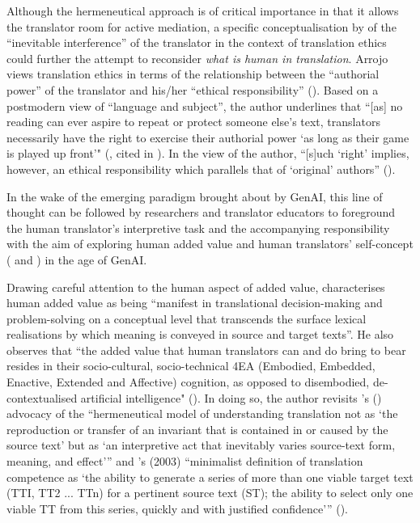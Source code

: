 \documentclass[output=paper,colorlinks,citecolor=brown]{langscibook}
\begin{document}
Although the hermeneutical approach is of critical importance in that it allows the translator room for active mediation, a specific conceptualisation by \citet[18]{arrojo1997} of the “inevitable interference” of the translator in the context of translation ethics could further the attempt to reconsider \textit{what is human in translation}. Arrojo views translation ethics in terms of the relationship between the “authorial power” of the translator and his/her “ethical responsibility” (\cite[18]{arrojo1997}). Based on a postmodern view of “language and subject”, the author underlines that “[as] no reading can ever aspire to repeat or protect someone else’s text, translators necessarily have the right to exercise their authorial power ‘as long as their game is played up front’" (\cite[93]{berman1995}, cited in \cite[36]{simon1996}). In the view of the author, “[s]uch ‘right’ implies, however, an ethical responsibility which parallels that of ‘original’ authors” (\cite[18]{arrojo1997}).

In the wake of the emerging paradigm brought about by GenAI, this line of thought can be followed by researchers and translator educators to foreground the human translator’s interpretive task and the accompanying responsibility with the aim of exploring human added value \citep{massey_translation_2021} and human translators’ self-concept (\cite{kiraly1990,kiraly2000,harokiraly2019} and \cite{MasseyKıraly}) in the age of GenAI.

Drawing careful attention to the human aspect of added value, \citet[39]{massey_translation_2021} characterises human added value as being “manifest in translational decision-making and problem-solving on a conceptual level that transcends the surface lexical realisations by which meaning is conveyed in source and target texts”. He also observes that “the added value that human translators can and do bring to bear resides in their socio-cultural, socio-technical 4EA (Embodied, Embedded, Enactive, Extended and Affective) cognition, as opposed to disembodied, de-contextualised artificial intelligence" (\cite[39]{massey_translation_2021}). In doing so, the author revisits \citeauthor{venuti2019}’s (\citeyear{venuti2019}) advocacy of the “hermeneutical model of understanding translation not as ‘the reproduction or transfer of an invariant that is contained in or caused by the source text’ but as ‘an interpretive act that inevitably varies source-text form, meaning, and effect’” and \citeauthor{pym_redefining_2003}’s (2003) “minimalist definition of translation competence as ‘the ability to generate a series of more than one viable target text (TTI, TT2 ... TTn) for a pertinent source text (ST); the ability to select only one viable TT from this series, quickly and with justified confidence’” (\cite[51]{massey_translation_2021}).
\end{document}
